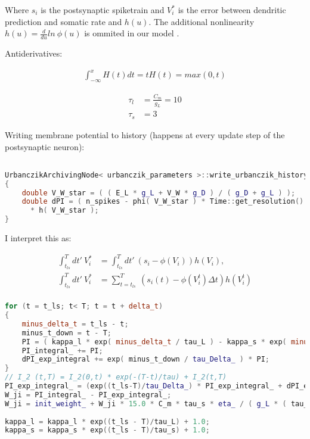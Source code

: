 Where $s_i$ is the postsynaptic spiketrain and $V_i^*$ is the error between dendritic prediction and somatic rate and
$h( u )$. The additional nonlinearity $h( u ) = \frac{d}{du} ln \  \phi(u)$ is ommited in our model .




Antiderivatives:

\begin{align}
  \int_{-\infty}^x H(t)dt = tH(t) = max(0,t)
\end{align}


\begin{align}
  \tau_l & = \frac{C_m}{g_L} = 10 \\
  \tau_s & = 3
\end{align}

Writing membrane potential to history (happens at every update step of the postsynaptic neuron):

\begin{lstlisting}[language=C++, directivestyle={\color{black}}
                   emph={int,char,double,float,unsigned,exp},
                   emphstyle={\color{blue}}]

UrbanczikArchivingNode< urbanczik_parameters >::write_urbanczik_history(Time t, double V_W, int n_spikes, int comp)
{
	double V_W_star = ( ( E_L * g_L + V_W * g_D ) / ( g_D + g_L ) );
	double dPI = ( n_spikes - phi( V_W_star ) * Time::get_resolution().get_ms() )
      * h( V_W_star );
}\end{lstlisting}

I interpret this as:


\begin{align}
  \int_{t_{ls}}^T dt' \ V_i^* & = \int_{t_{ls}}^T dt' \  (s_i - \phi(V_i )) h(V_i),               \\
  \int_{t_{ls}}^T dt' \ V_i^* & = \sum_{t=t_{ls}}^T \  (s_i(t) -  \phi(V_i^t ) \Delta t) h(V_i^t) \\
\end{align}

\begin{lstlisting}[language=C++, directivestyle={\color{black}}
                   emph={int,char,double,float,unsigned,exp},
                   emphstyle={\color{blue}}]
for (t = t_ls; t< T; t = t + delta_t)
{
   	minus_delta_t = t_ls - t;
    minus_t_down = t - T;
    PI = ( kappa_l * exp( minus_delta_t / tau_L ) - kappa_s * exp( minus_delta_t / tau_s ) ) * V_star(t);
    PI_integral_ += PI;
    dPI_exp_integral += exp( minus_t_down / tau_Delta_ ) * PI;
}  
// I_2 (t,T) = I_2(0,t) * exp(-(T-t)/tau) + I_2(t,T)
PI_exp_integral_ = (exp((t_ls-T)/tau_Delta_) * PI_exp_integral_ + dPI_exp_integral);
W_ji = PI_integral_ - PI_exp_integral_;
W_ji = init_weight_ + W_ji * 15.0 * C_m * tau_s * eta_ / ( g_L * ( tau_L - tau_s ) );    
  
kappa_l = kappa_l * exp((t_ls - T)/tau_L) + 1.0;
kappa_s = kappa_s * exp((t_ls - T)/tau_s) + 1.0;
  \end{lstlisting}


